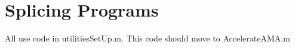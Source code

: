 \documentclass[12pt]{article}
\begin{document}











\section{Splicing Programs}
\label{sec:splicing-programs}

All use code in utilitiesSetUp.m.  This code should move to AccelerateAMA.m
\newcommand{\listProg}[2]{\item #1

#2

\listinginput{1}{../code/#1}}
\end{document}
